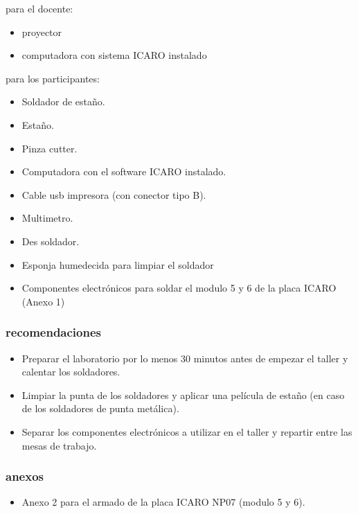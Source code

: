 para el docente:
\begin{itemize}
  \item proyector
  \item computadora con sistema ICARO instalado
\end{itemize}
para los participantes:
\begin{itemize}
  \item Soldador de estaño.
  \item Estaño.
  \item Pinza cutter.
  \item Computadora con el software ICARO instalado.
  \item Cable usb impresora (con conector tipo B).
  \item Multimetro.
  \item Des soldador.
  \item Esponja humedecida para limpiar el soldador
  \item Componentes electrónicos para soldar el modulo 5 y 6 de la placa ICARO (Anexo 1) 
\end{itemize}

\subsubsection{recomendaciones}

\begin{itemize}
  \item Preparar el laboratorio por lo menos 30 minutos antes de empezar el taller y calentar los soldadores.

  \item Limpiar la punta de los soldadores y aplicar una película de estaño (en caso de los soldadores de punta metálica).

  \item Separar los componentes electrónicos a utilizar en el taller y repartir entre las mesas de trabajo.

\end{itemize}

\subsubsection{anexos}
\begin{itemize}
  \item Anexo 2 para el armado de la placa ICARO NP07 (modulo 5 y 6).
\end{itemize}
\newpage
